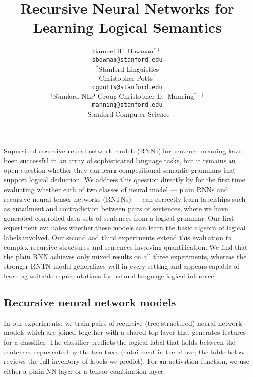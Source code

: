 \documentclass{article} %
\title{Recursive Neural Networks for Learning Logical Semantics}
\author{
Samuel R.\ Bowman$^{\ast\dag}$ \\
\texttt{sbowman@stanford.edu} \\[2ex]
$^{\ast}$Stanford Linguistics \\
\And
Christopher Potts$^{\ast}$\\
\texttt{cgpotts@stanford.edu} \\[2ex]
$^{\dag}$Stanford NLP Group
\And
Christopher D.\ Manning$^{\ast\dag\ddag}$\\
\texttt{manning@stanford.edu}\\[2ex]
$^{\ddag}$Stanford Computer Science
}
\def\ii#1{\textit{#1}}
\begin{document}
\maketitle


  Supervised recursive neural network models (RNNs) for sentence
  meaning have been successful in an array of sophisticated language
  tasks, but it remains an open question whether they can learn
  compositional semantic grammars that support logical deduction.  We
  address this question directly by for the first time evaluating
  whether each of two classes of neural model --- plain RNNs and
  recursive neural tensor networks (RNTNs) --- can correctly learn
  labelships such as entailment and contradiction between pairs of
  sentences, where we have generated controlled data sets of sentences
  from a logical grammar.  Our first experiment evaluates whether
  these models can learn the basic algebra of logical labels
  involved. Our second and third experiments extend this evaluation to
  complex recursive structures and sentences involving quantification.
  We find that the plain RNN achieves only mixed results on all three
  experiments, whereas the stronger RNTN model generalizes well in
  every setting and appears capable of learning suitable
  representations for natural language logical inference.

\subsection*{Recursive neural network models}

\begin{figure}[hp]
  \centering\resizebox{4.5in}{!}{
  }
  \label{sample-figure}
\end{figure}

In our experiments, we train pairs of recursive (tree structured) neural network models \cite{socher2013acl1} which are joined together with a shared top layer that generates features for a classifier. The classifier predicts the logical label that holds between the sentences represented by the two trees (entailment in the above; the table below reviews the full inventory of labels we predict). For an activation function, we use either a plain NN layer or a tensor combination layer.
\end{document}
